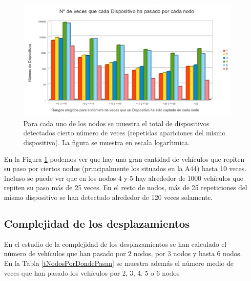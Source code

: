 \documentclass[twocolumn,twoside]{Jornadas}
\begin{document}
 \begin{figure}[htb]
 \begin{center}
 \includegraphics[scale=0.20]{Intervalos.jpg}
 \caption{Para cada uno de los nodos se muestra el total de dispositivos detectados cierto número de veces (repetidas apariciones del mismo dispositivo). La figura se muestra en escala logarítmica.
 \label{Intervalos}}
 \end{center}
 \end{figure}
 

En la Figura \ref{Intervalos} podemos ver que hay una gran cantidad de vehículos que repiten su paso por ciertos nodos (principalmente los situados en la A44) hasta 10 veces. 
Incluso se puede ver que en los nodos 4 y 5 hay alrededor de 1000 vehículos que repiten su paso más de 25 veces. En el resto de nodos, más de 25 repeticiones del mismo dispositivo 
se han detectado alrededor de 120 veces solamente.



\subsection{Complejidad de los desplazamientos}

En el estudio de la complejidad de los desplazamientos se han calculado el número de vehículos que han pasado por 2 nodos, por 3 nodos y hasta 6 nodos. 
En la Tabla \ref{tNodosPorDondePasan} se muestra además el número medio de veces que han pasado los vehículos por 2, 3, 4, 5 o 6 nodos
\end{document}
